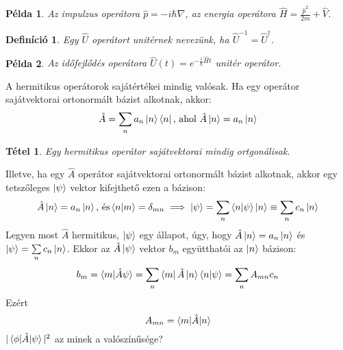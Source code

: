 \documentclass[12pt]{article}
\theoremstyle{plain}
\newtheorem*{theorem*}{Tétel}
\newtheorem*{def*}{Definíció}
\newtheorem*{pld*}{Példa}
\begin{document}
\begin{pld*}
    Az impulzus operátora $\hat p = -i\hbar \nabla$, az energia operátora $\hat H = \frac{\hat p^2}{2m} + \hat V$.
\end{pld*}

\begin{def*}
    Egy $\hat U$ operátort unitérnek nevezünk, ha $\hat U^{-1} = \hat U ^\dag$.
\end{def*}

\begin{pld*}
    Az időfejlődés operátora $\hat U(t) = e^{-\frac{i}{\hbar}\hat H t}$ unitér operátor.
\end{pld*}

A hermitikus operátorok sajátértékei mindig valósak. Ha egy operátor sajátvektorai ortonormált bázist alkotnak, akkor:
$$ \hat A = \sum\limits_{n} a_n \ket n \bra n \textrm{, ahol } \hat A \ket n = a_n \ket n $$
\begin{theorem*}
    Egy hermitikus operátor sajátvektorai mindig ortgonálisak.
\end{theorem*}
Illetve, ha egy $\hat A$ operátor sajátvektorai ortonormált bázist alkotnak, akkor egy tetszőleges $\ket \psi$ vektor
kifejthető ezen a bázison:
$$\hat A \ket n = a_n \ket n \textrm{, és} \braket{n|m} = \delta_{mn} \implies \ket\psi = \sum\limits_n \braket{n|\psi} \ket n 
\equiv  \sum\limits_n c_n \ket n$$ 
Legyen most $\hat A$ hermitikus, $\ket\psi$ egy állapot, úgy, hogy $\hat A \ket n = a_n\ket n$ és $\ket\psi = \sum\limits_n c_n \ket n$.
Ekkor az $\hat A \ket\psi$ vektor $b_m$ együtthatói az $\ket n$ bázison:
$$b_m = \braket{m|\hat A \psi} = \sum\limits_n \bra{m} \hat A \ket n \braket{n|\psi} = \sum\limits_n A_{mn}c_n$$
Ezért $$A_{mn} = \braket{ m |\hat A | n }$$
$|\braket{ \phi | \hat A | \psi}|^2$ az minek a valószínűsége?
\end{document}
